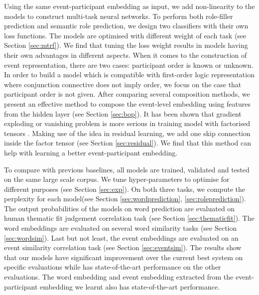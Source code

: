 \documentclass[a4paper]{article}
\begin{document}
Using the same event-participant embedding as input, we add non-linearity to the models to construct multi-task neural networks. To perform both role-filler prediction and semantic role prediction, we design two classifiers with their own loss functions. The models are optimised with different weight of each task (see Section \ref{sec:mtrf}). We find that tuning the loss weight results in models having their own advantages in different aspects. When it comes to the construction of event representation, there are two cases: participant order is known or unknown. In order to build a model which is compatible with first-order logic representation where conjunction connective does not imply order, we focus on the case that participant order is not given. After comparing several composition methods, we present an effective method to compose the event-level embedding using features from the hidden layer (see Section \ref{sec:bop}). It has been shown that gradient exploding or vanishing problem is more serious in training model with factorised tensors \citep{sutskever2011generating}.  Making use of the idea in residual learning, we add one skip connection inside the factor tensor (see Section \ref{sec:residual}). We find that this method can help with learning a better event-participant embedding.

To compare with previous baselines, all models are trained, validated and tested on the same large scale corpus. We tune hyper-parameters to optimise for different purposes (see Section \ref{sec:exp}). On both three tasks, we compute the perplexity for each model(see Section \ref{sec:wordprediction}, \ref{sec:roleprediction}). The output probabilities of the models on word prediction are evaluated on human thematic fit judgement correlation task (see Section \ref{sec:thematicfit}). The word embeddings are evaluated on several word similarity tasks (see Section \ref{sec:wordsim}). Last but not least, the event embeddings are evaluated on an event similarity correlation task (see Section \ref{sec:eventsim}). The results show that our models have significant improvement over the current best system on specific evaluations while has state-of-the-art performance on the other evaluations. The word embedding and event embedding extracted from the event-participant embedding we learnt also has state-of-the-art performance. 
% 
% 
% 
%
% 
%
\end{document}
